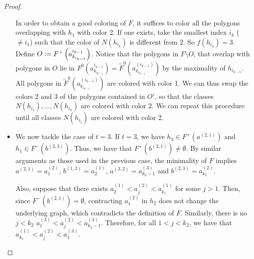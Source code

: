 \documentclass[12pt]{article}
\theoremstyle{definition}
\newcommand{\defeq}{\vcentcolon=}
\begin{document}
\begin{proof}
\begin{itemize}
             In order to obtain a good coloring
             of $F$, it suffices to color all the polygons
             overlapping with $h_1$ with color 2.
             If one exists, take the smallest index
             $i_{k}$ ($\neq i_1$) such that 
             the color of $N\left(h_{i_{k}}\right)$ 
             is different from 2. So $f\left(h_{i_{k}}\right) = 3$.
             Define $O \defeq F^{+}\left(a_{k_{i_{k-1}}}^{i_{k-1}}\right)$.
             Notice that the polygons 
             in $F \setminus O$, that overlap
             with polygons in $O$ lie in
             $F^{0}\left(a_{k_{i_{k-1}}}^{i_{k-1}}\right) =
             \widetilde{F}^{0}\left(a_{k_{i_{k-1}}}^{\left(i_{k-1}\right)}\right)$
             by the maximality of $h_{i_{k-1}}$.
             All polygons in
             $\widetilde{F}^{0}\left(a_{k_{i_{k-1}}}^{\left(i_{k-1}\right)}\right)$
             are colored
             with color 1.
             We can thus swap the colors
             2 and 3 of the polygons 
             contained in $O'$, so that
             the classes $N\left(h_{i_1}\right),
             \ldots, N\left(h_{i_{k}}\right)$ are
             colored with color 2.
             We can repeat this procedure until
             all classes $N\left(h_{i_{j}}\right)$ 
             are colored with color 2.

             \item We now tackle the case of $t = 3$.
             If $t = 3$, we have $h_3 \in F^{+}
             \left(a^{\left(2, 1\right)}\right)$ 
             and $h_1 \in F^{-}\left(b^{\left(2, 3\right)}\right)$.
             Thus, we have that $F^{+}\left(b^{\left(2, 1\right)}\right)
             \neq \emptyset$.
             By similar arguments as those
             used in the previous case,
             the minimality of $F$ implies
             $a^{\left(2, 1\right)} = a_1^{\left(2\right)}$,
             $b^{\left(1, 2\right)} = a_2^{\left(1\right)}$,
             $a^{\left(3, 2\right)} = a_{k_3 - 1}^{\left(3\right)}$ and
             $b^{\left(2, 3\right)} = a_{k_2}^{\left(2\right)}$.

             Also, suppose that there exists
             $a_2^{\left(1\right)} < a_{j}^{\left(2\right)} <
             a_{k_1}^{\left(1\right)}$ for
             some $j > 1$. Then,
             since $F^{-}\left(b^{\left(2, 1\right)}\right) = \emptyset$, 
             contracting $a_1^{\left(2\right)}$ 
             in $h_2$ does not change the
             underlying graph, which
             contradicts the definition of $F$.
             Similarly, there is no
             $j < k_2$ $a_1^{\left(3\right)} <
             a_{j}^{\left(2\right)} <
             a_{k_3-1}^{\left(3\right)}$.
             Therefore, for all
             $1 < j < k_2$, we have
             that $a_{k_1}^{\left(1\right)} < 
             a_{j}^{\left(2\right)} < 
             a_1^{\left(3\right)}$.


\end{itemize}
\end{proof}
\end{document}
